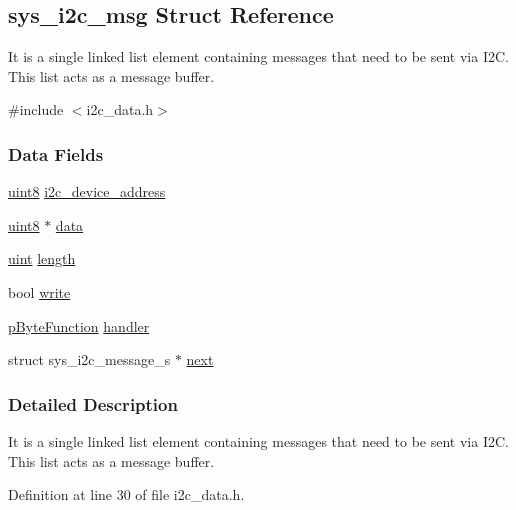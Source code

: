 \hypertarget{structsys__i2c__msg}{}\subsection{sys\+\_\+i2c\+\_\+msg Struct Reference}
\label{structsys__i2c__msg}


It is a single linked list element containing messages that need to be sent via I2\+C. This list acts as a message buffer.  




{\ttfamily \#include $<$i2c\+\_\+data.\+h$>$}

\subsubsection*{Data Fields}
\begin{DoxyCompactItemize}
\item 
\hyperlink{definitions_8h_adde6aaee8457bee49c2a92621fe22b79}{uint8} \hyperlink{structsys__i2c__msg_a0657e58d9f887db8a031ad86e7fb8fd7}{i2c\+\_\+device\+\_\+address}
\item 
\hyperlink{definitions_8h_adde6aaee8457bee49c2a92621fe22b79}{uint8} $\ast$ \hyperlink{structsys__i2c__msg_a93aff6118afb10c8c7ca0401d3ee41e5}{data}
\item 
\hyperlink{definitions_8h_a1445ebbbf93d62972255ec5e89a5ab01}{uint} \hyperlink{structsys__i2c__msg_a92073f759594ee543835f8ad73031e11}{length}
\item 
bool \hyperlink{structsys__i2c__msg_ac4d2c8d778512502b11f6ec055b2daf5}{write}
\item 
\hyperlink{definitions_8h_a82fa7f76266ee1d687b76a44445f21ef}{p\+Byte\+Function} \hyperlink{structsys__i2c__msg_af659ffc0b34b155664e99fafc6a6cc5f}{handler}
\item 
struct sys\+\_\+i2c\+\_\+message\+\_\+s $\ast$ \hyperlink{structsys__i2c__msg_af32e596f9bfb62fb8cb06d996c1573d2}{next}
\end{DoxyCompactItemize}


\subsubsection{Detailed Description}
It is a single linked list element containing messages that need to be sent via I2\+C. This list acts as a message buffer. 

Definition at line 30 of file i2c\+\_\+data.\+h.



